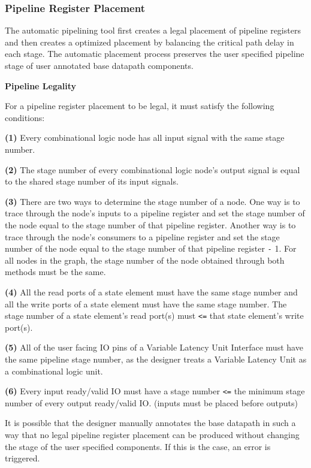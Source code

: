 \subsubsection{Pipeline Register Placement}
\label{section:registerPlacement}
The automatic pipelining tool first creates a legal placement of pipeline registers and then creates a optimized placement by balancing the critical path delay in each stage. The automatic placement process preserves the user specified pipeline stage of user annotated base datapath components.


{\bf Pipeline Legality}

For a pipeline register placement to be legal, it must satisfy the following conditions:

{\bf (1)} Every combinational logic node has all input signal with the same stage number.  

{\bf (2)} The stage number of every combinational logic node's output signal is equal to the shared stage number of its input signals.

{\bf (3)} There are two ways to determine the stage number of a node. One way is to trace through the node's inputs to a pipeline register and set the stage number of the node equal to the stage number of that pipeline register. Another way is to trace through the node’s consumers to a pipeline register and set the stage number of the node equal to the stage number of that pipeline register {\tt -}  1. For all nodes in the graph, the stage number of the node obtained through both methods must be the same.

{\bf (4)} All the read ports of a state element must have the same stage number and all the write ports of a state element must have the same stage number. The stage number of a state element's read port(s) must {\tt <=} that state element's write port(s).

{\bf (5)} All of the user facing IO pins of a Variable Latency Unit Interface must have the same pipeline stage number, as the designer treats a Variable Latency Unit as a combinational logic unit.

{\bf (6)} Every input ready/valid IO must have a stage number {\tt <=} the minimum stage number of every output ready/valid IO. (inputs must be placed before outputs)

It is possible that the designer manually annotates the base datapath in such a way that no legal pipeline register placement can be produced without changing the stage of the user specified components. If this is the case, an error is triggered.


